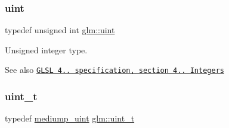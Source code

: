 \subsubsection{\texorpdfstring{uint}{uint}}
{\footnotesize\ttfamily typedef unsigned int \hyperlink{group__core__precision_ga4fd29415871152bfb5abd588334147c8}{glm\+::uint}}

Unsigned integer type.

\begin{DoxySeeAlso}{See also}
\href{http://www.opengl.org/registry/doc/GLSLangSpec.4.20.8.pdf}{\tt G\+L\+SL 4.. specification, section 4.. Integers} 
\end{DoxySeeAlso}
\mbox{\label{group__core__precision_ga5f2ae871c284c9d39ae8fdbb1305b566}} 
\subsubsection{\texorpdfstring{uint\+\_\+t}{uint\_t}}
{\footnotesize\ttfamily typedef \hyperlink{group__core__precision_ga08ae38ad78ade3539fdd1d25052b8c51}{mediump\+\_\+uint} \hyperlink{group__core__precision_ga5f2ae871c284c9d39ae8fdbb1305b566}{glm\+::uint\+\_\+t}}

